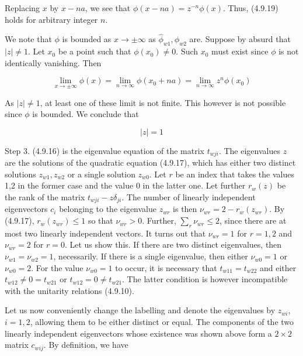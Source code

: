 \documentclass{article}
\begin{document}
Replacing $x$ by $x-n a$, we see that $\phi(x-n a)=z^{-n} \phi(x)$. Thus, (4.9.19) holds for arbitrary integer $n$.

We note that $\phi$ is bounded as $x \rightarrow \pm \infty$ as $\hat{\phi}_{w 1}, \hat{\phi}_{w 2}$ are. Suppose by absurd that $|z| \neq 1$. Let $x_{0}$ be a point such that $\phi\left(x_{0}\right) \neq 0$. Such $x_{0}$ must exist since $\phi$ is not identically vanishing. Then
 
\begin{equation*}
\lim _{x \rightarrow \pm \infty} \phi(x)=\lim _{n \rightarrow \infty} \phi\left(x_{0}+n a\right)=\lim _{n \rightarrow \infty} z^{n} \phi\left(x_{0}\right) \tag{4.9.20}
\end{equation*}
 

As $|z| \neq 1$, at least one of these limit is not finite. This however is not possible since $\phi$ is bounded. We conclude that
 
\begin{equation*}
|z|=1 \tag{4.9.21}
\end{equation*}
 

Step 3. (4.9.16) is the eigenvalue equation of the matrix $t_{w j i}$. The eigenvalues $z$ are the solutions of the quadratic equation (4.9.17), which has either two distinct solutions $z_{w 1}, z_{w 2}$ or a single solution $z_{w 0}$. Let $r$ be an index that takes the values 1,2 in the former case and the value 0 in the latter one. Let further $r_{w}(z)$ be the rank of the matrix $t_{w j i}-z \delta_{j i}$. The number of linearly independent eigenvectors $c_{i}$ belonging to the eigenvalue $z_{w r}$ is then $\nu_{w r}=2-r_{w}\left(z_{w r}\right)$. By (4.9.17), $r_{w}\left(z_{w r}\right) \leq 1$ so that $\nu_{w r}>0$. Further, $\sum_{r} \nu_{w r} \leq 2$, since there are at most two linearly independent vectors. It turns out that $\nu_{w r}=1$ for $r=1,2$ and $\nu_{w r}=2$ for $r=0$. Let us show this. If there are two distinct eigenvalues, then $\nu_{w 1}=\nu_{w 2}=1$, necessarily. If there is a single eigenvalue, then either $\nu_{w 0}=1$ or $\nu_{w 0}=2$. For the value $\nu_{w 0}=1$ to occur, it is necessary that $t_{w 11}=t_{w 22}$ and either $t_{w 12} \neq 0=t_{w 21}$ or $t_{w 12}=0 \neq t_{w 21}$. The latter condition is however incompatible with the unitarity relations (4.9.10).

Let us now conveniently change the labelling and denote the eigenvalues by $z_{w i}$, $i=1,2$, allowing them to be either distinct or equal. The components of the two linearly independent eigenvectors whose existence was shown above form a $2 \times 2$ matrix $c_{w i j}$. By definition, we have
 
\end{document}
